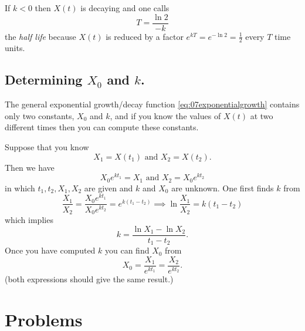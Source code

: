If $k<0$ then $X(t)$ is decaying and one calls
\[
T = \frac{\ln 2}{-k}
\]
the \emph{half life} because $X(t)$ is reduced by a factor $e^{kT} = e^{-\ln 2}
= \frac12$ every $T$ time units.




\subsection{Determining $X_0$ and $k$. } %
The general exponential growth/decay function \eqref {eq:07exponentialgrowth}
contains only two constants, $X_0$ and $k$, and if you know the values of $X(t)$
at two different times then you can compute these constants.

Suppose that you know
\[
X_1 = X(t_1) \text{ and } X_2=X(t_2).
\]
Then we have
\[
X_0e^{kt_1} = X_1 \text{ and } X_2 = X_0e^{kt_2}
\]
in which $t_1, t_2, X_1, X_2$ are given and $k$ and $X_0$ are unknown.  
One first finds $k$ from
\[
\frac{X_1}{X_2}= \frac{X_0e^{kt_1}}{X_0e^{kt_2}}
=e^{k(t_1-t_2)}
\implies \ln\frac{X_1}{X_2}= k(t_1-t_2)
\]
which implies
\[
k = \frac{\ln X_1 - \ln X_2}{t_1-t_2}.
\]
Once you have computed $k$ you can find $X_0$ from
\[
X_0 = \frac{X_1}{e^{kt_1}} = \frac{X_2}{e^{kt_2}}.
\]
(both expressions should give the same result.)
















\section{Problems} %
\problemfont %




